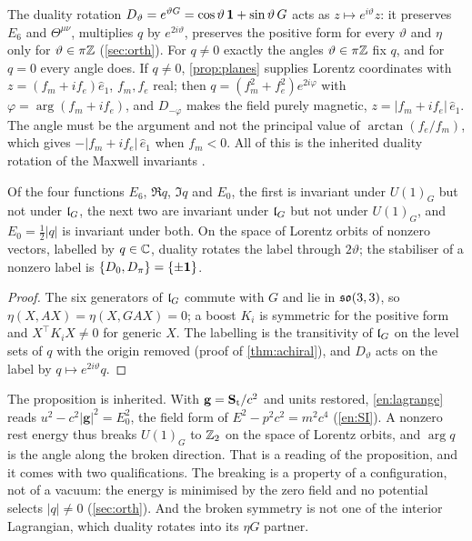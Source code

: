 The duality rotation $D_\vartheta=e^{\vartheta G}=\cos\vartheta\,\mathbf 1+\sin\vartheta\,G$ acts as $z\mapsto e^{i\vartheta}z$: it preserves $E_6$ and
$\Theta^{\mu\nu}$, multiplies $q$ by $e^{2i\vartheta}$, preserves the positive form for every $\vartheta$ and $\eta$ only for $\vartheta\in\pi\mathbb{Z}$
(\cref{sec:orth}). For $q\neq0$ exactly the angles $\vartheta\in\pi\mathbb{Z}$ fix $q$, and for $q=0$ every angle does. If $q\neq0$, \cref{prop:planes}
supplies Lorentz coordinates with $z=(f_m+if_e)\hat e_1$, $f_m,f_e$ real; then $q=(f_m^2+f_e^2)e^{2i\varphi}$ with $\varphi=\arg(f_m+if_e)$, and
$D_{-\varphi}$ makes the field purely magnetic, $z=|f_m+if_e|\,\hat e_1$. The angle must be the argument and not the principal value of
$\arctan(f_e/f_m)$, which gives $-|f_m+if_e|\,\hat e_1$ when $f_m<0$. All of this is the inherited duality rotation of the Maxwell invariants
\cite{Rainich1925,Calkin65,DeserTeitelboim76}.

\begin{proposition}
\label{en:doubly}
Of the four functions $E_6$, $\Re q$, $\Im q$ and $E_0$, the first is invariant under $U(1)_G$ but not under $\mathfrak l_G$, the next two are invariant under
$\mathfrak l_G$ but not under $U(1)_G$, and $E_0=\tfrac12|q|$ is invariant under both. On the space of Lorentz orbits of nonzero vectors, labelled by
$q\in\mathbb{C}$, duality rotates the label through $2\vartheta$; the stabiliser of a nonzero label is $\{D_0,D_\pi\}=\{\pm\mathbf 1\}$.
\end{proposition}

\begin{proof}
The six generators of $\mathfrak l_G$ commute with $G$ and lie in $\mathfrak{so}(3,3)$, so $\eta(X,AX)=\eta(X,GAX)=0$; a boost $K_i$ is symmetric for the positive form
and $X^{\!\top}K_iX\neq0$ for generic $X$. The labelling is the transitivity of $\mathfrak l_G$ on the level sets of $q$ with the origin removed (proof of
\cref{thm:achiral}), and $D_\vartheta$ acts on the label by $q\mapsto e^{2i\vartheta}q$.
\end{proof}

The proposition is inherited. With $\mathbf g=\mathbf S_{\rm t}/c^2$ and units restored, \eqref{en:lagrange} reads $u^2-c^2|\mathbf g|^2=E_0^2$, the
field form of $E^2-p^2c^2=m^2c^4$ (\cref{en:SI}). A nonzero rest energy thus breaks $U(1)_G$ to $\mathbb{Z}_2$ on the space of Lorentz orbits, and $\arg q$ is the angle along the broken
direction. That is a
reading of the proposition, and it comes with two qualifications. The breaking is a property of a configuration, not of a vacuum: the energy is
minimised by the zero field and no potential selects $|q|\neq0$ (\cref{sec:orth}). And the broken symmetry is not one of the interior Lagrangian,
which duality rotates into its $\eta G$ partner.


